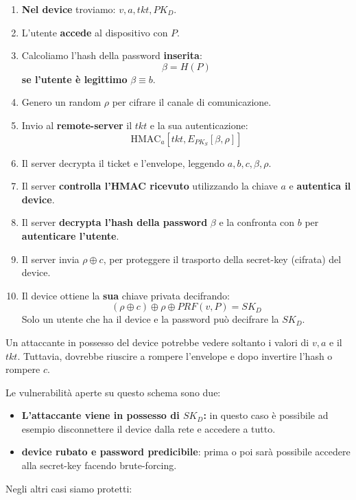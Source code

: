 \begin{definition}\label{def:keyretr}
\begin{enumerate}
    \item \textbf{Nel device} troviamo: $v,a,tkt,PK_D$.
    \item L'utente \textbf{accede} al dispositivo con $P$.
    \item Calcoliamo l'hash della password \textbf{inserita}:\[\beta=H(P)\]
    \textbf{se l'utente è legittimo} $\beta\equiv b$.
    \item Genero un random $\rho$ per cifrare il canale di comunicazione.
    \item Invio al \textbf{remote-server} il $tkt$ e la sua autenticazione:
    \[\text{HMAC}_a[tkt, E_{PK_S}[\beta,\rho]]\]
    \item Il server decrypta il ticket e l'envelope, leggendo $a,b,c,\beta,\rho$.
    \item Il server \textbf{controlla l'HMAC ricevuto} utilizzando la chiave $a$ e \textbf{autentica il device}.
    \item Il server \textbf{decrypta l'hash della password} $\beta$ e la confronta con $b$ per \textbf{autenticare l'utente}.
    \item Il server invia $\rho\oplus c$, per proteggere il trasporto della secret-key (cifrata) del device.
    \item Il device ottiene la \textbf{sua} chiave privata decifrando:
    \[(\rho \oplus c)\oplus \rho \oplus PRF(v,P)=SK_D\]
    Solo un utente che ha il device e la password può decifrare la $SK_D$.
    \end{enumerate}
\end{definition}
\begin{note}
Un attaccante in possesso del device potrebbe vedere soltanto i valori di $v,a$ e il $tkt$. Tuttavia, dovrebbe riuscire a rompere l'envelope e dopo invertire l'hash o rompere $c$.
\end{note}
Le vulnerabilità aperte su questo schema sono due:
\begin{itemize}
    \item \textbf{L'attaccante viene in possesso di $SK_D$:} in questo caso è possibile ad esempio disconnettere il device dalla rete e accedere a tutto.
    \item \textbf{device rubato e password predicibile}: prima o poi sarà possibile accedere alla secret-key facendo brute-forcing.
\end{itemize}
Negli altri casi siamo protetti:
